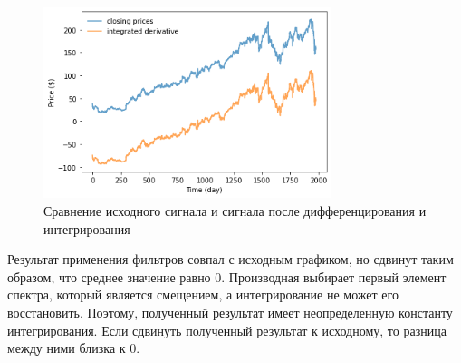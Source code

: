 \documentclass[a4paper, 12pt]{report}
\begin{document}
	\begin{figure}[H]
		\centering
		\includegraphics[width=0.75\textwidth]{int3.png}
		\caption{Сравнение исходного сигнала и сигнала после дифференцирования и интегрирования}
		\label{fig:int3}
	\end{figure}
	Результат применения фильтров совпал с исходным графиком, но сдвинут таким образом, что среднее значение равно 0. Производная выбирает первый элемент спектра, который является смещением, а интегрирование не может его восстановить. Поэтому, полученный результат имеет неопределенную константу интегрирования.
	Если сдвинуть полученный результат к исходному, то разница между ними близка к 0.
\end{document}

